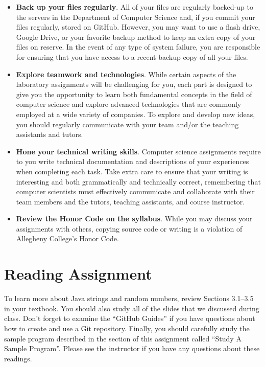 \documentclass[11pt]{article}
\begin{document}
\begin{itemize}
\item {\bf Back up your files regularly}. All of your files are regularly backed-up to the servers in the Department of
  Computer Science and, if you commit your files regularly, stored on GitHub. However, you may want to use a flash
  drive, Google Drive, or your favorite backup method to keep an extra copy of your files on reserve. In the event of
  any type of system failure, you are responsible for ensuring that you have access to a recent backup copy of all your
  files.

\item {\bf Explore teamwork and technologies}. While certain aspects of the laboratory assignments will be challenging
  for you, each part is designed to give you the opportunity to learn both fundamental concepts in the field of computer
  science and explore advanced technologies that are commonly employed at a wide variety of companies. To explore and
  develop new ideas, you should regularly communicate with your team and/or the teaching assistants and tutors.

\item {\bf Hone your technical writing skills}. Computer science assignments require to you write technical
  documentation and descriptions of your experiences when completing each task. Take extra care to ensure that your
  writing is interesting and both grammatically and technically correct, remembering that computer scientists must
  effectively communicate and collaborate with their team members and the tutors, teaching assistants, and course
  instructor.

\item {\bf Review the Honor Code on the syllabus}. While you may discuss your assignments with others, copying source
  code or writing is a violation of Allegheny College's Honor Code.

\end{itemize}

\section*{Reading Assignment}

To learn more about Java strings and random numbers, review Sections 3.1--3.5 in your textbook. You should also study
all of the slides that we discussed during class. Don't forget to examine the ``GitHub Guides'' if you have questions
about how to create and use a Git repository. Finally, you should carefully study the sample program described in the
section of this assignment called ``{Study A Sample Program}''. Please see the instructor if you have any questions
about these readings.
\end{document}
